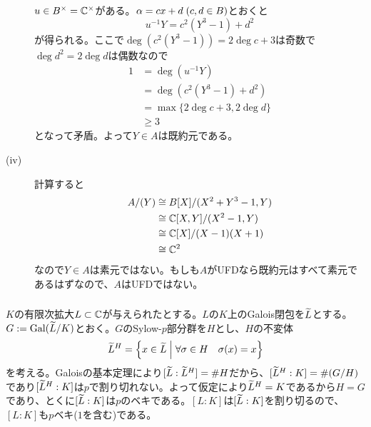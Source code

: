 \begin{sol}
\begin{description}
$u \in B^{\times} = {\mathbb C}^{\times}$がある。${\alpha} = c x + d \; (c,d \in B)$とおくと
\[
u^{-1} Y = c^2 (Y^3-1) + d^2
\]
が得られる。ここで$\deg(c^2(Y^3-1)) = 2 \deg c + 3$は奇数で$\deg d^2 = 2 \deg d$は偶数なので
\begin{align*}
  1 &= \deg (u^{-1}Y) \\
  &= \deg( c^2 (Y^3-1) + d^2 ) \\
  &= \max\{ 2 \deg c + 3,  2 \deg d \} \\
  &\geq 3
\end{align*}
となって矛盾。よって$Y \in A$は既約元である。
\item[(iv)] 計算すると
\begin{align*}
  A/(Y) &\cong B[X]/(X^2 + Y^3 -1, Y) \\
  &\cong {\mathbb C}[X,Y]/(X^2-1,Y) \\
  &\cong {\mathbb C}[X]/(X-1)(X+1) \\
  &\cong {\mathbb C}^2
\end{align*}
なので$Y \in A$は素元ではない。もしも$A$がUFDなら既約元はすべて素元であるはずなので、$A$はUFDではない。
  \end{description}
\end{sol}

\newpage


\subsubsection{}%
\begin{sol}
  $K$の有限次拡大$L \subset {\mathbb C}$が与えられたとする。$L$の$K$上のGalois閉包を$\widetilde{L}$とする。$G:= \operatorname{Gal}(\widetilde{L}/K)$とおく。$G$のSylow-$p$部分群を$H$とし、$H$の不変体
  \[
  \widetilde{L}^H = \left\{ x \in \widetilde{L} \mathrel{} \middle| \mathrel{} \forall {\sigma} \in H \quad {\sigma}(x) = x  \right\}
  \]
  を考える。Galoisの基本定理により$[\widetilde{L}:\widetilde{L}^H] = \# H$だから、$[\widetilde{L}^H : K] = \# (G / H)$であり$[\widetilde{L}^H : K]$は$p$で割り切れない。よって仮定により$\widetilde{L}^H =K$であるから$H=G$であり、とくに$[\widetilde{L}:K]$は$p$のベキである。$[L:K]$は$[\widetilde{L}:K]$を割り切るので、
  $[L:K]$も$p$ベキ($1$を含む)である。
\end{sol}


\newpage



